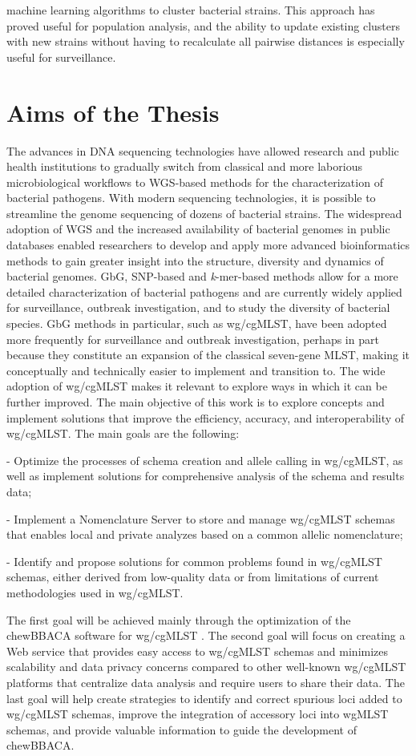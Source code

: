 machine learning algorithms to cluster bacterial strains. This approach has proved useful for population analysis, and the ability to update existing clusters with new strains without having to recalculate all pairwise distances is especially useful for surveillance.

\section{Aims of the Thesis}

The advances in \ac{DNA} sequencing technologies have allowed research and public health institutions to gradually switch from classical and more laborious microbiological workflows to \ac{WGS}-based methods for the characterization of bacterial pathogens. With modern sequencing technologies, it is possible to streamline the genome sequencing of dozens of bacterial strains. The widespread adoption of \ac{WGS} and the increased availability of bacterial genomes in public databases enabled researchers to develop and apply more advanced bioinformatics methods to gain greater insight into the structure, diversity and dynamics of bacterial genomes. \ac{GbG}, \ac{SNP}-based and \textit{k}-mer-based methods allow for a more detailed characterization of bacterial pathogens and are currently widely applied for surveillance, outbreak investigation, and to study the diversity of bacterial species. \ac{GbG} methods in particular, such as \ac{wg/cgMLST}, have been adopted more frequently for surveillance and outbreak investigation, perhaps in part because they constitute an expansion of the classical seven-gene \ac{MLST}, making it conceptually and technically easier to implement and transition to. The wide adoption of \ac{wg/cgMLST} makes it relevant to explore ways in which it can be further improved. The main objective of this work is to explore concepts and implement solutions that improve the efficiency, accuracy, and interoperability of \ac{wg/cgMLST}. The main goals are the following:

- Optimize the processes of schema creation and allele calling in \ac{wg/cgMLST}, as well as implement solutions for comprehensive analysis of the schema and results data;

- Implement a Nomenclature Server to store and manage \ac{wg/cgMLST} schemas that enables local and private analyzes based on a common allelic nomenclature;

- Identify and propose solutions for common problems found in \ac{wg/cgMLST} schemas, either derived from low-quality data or from limitations of current methodologies used in \ac{wg/cgMLST}.

The first goal will be achieved mainly through the optimization of the chewBBACA software for \ac{wg/cgMLST} \cite{silva_chewbbaca_2018}. The second goal will focus on creating a Web service that provides easy access to \ac{wg/cgMLST} schemas and minimizes scalability and data privacy concerns compared to other well-known \ac{wg/cgMLST} platforms that centralize data analysis and require users to share their data. The last goal will help create strategies to identify and correct spurious loci added to \ac{wg/cgMLST} schemas, improve the integration of accessory loci into \ac{wgMLST} schemas, and provide valuable information to guide the development of chewBBACA.
